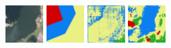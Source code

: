 \begin{figure}
    \newcommand{\DensenetPredictionsImageWidth}{0.13\textwidth}
    \centering

    \includegraphics[width=\DensenetPredictionsImageWidth]{images/densenet/101444-image} \hfill
    \includegraphics[width=\DensenetPredictionsImageWidth]{images/densenet/101444-label} \hfill
    \includegraphics[width=\DensenetPredictionsImageWidth]{images/densenet/densenet-103D/101444-prediction} \hfill
    \includegraphics[width=\DensenetPredictionsImageWidth]{images/densenet/densenet-103CD/101444-prediction} \hfill

\end{figure}
